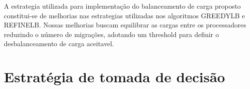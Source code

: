 A estrategia utilizada para implementação do balanceamento de carga proposto constitui-se de melhorias nas estrategias utilizadas nos algoritmos GREEDYLB e REFINELB. Nossas melhorias buscam equilibrar as cargas entre os processadores reduzindo o número de migrações, adotando um threshold para definir o desbalanceamento de carga aceitavel. 

\section{Estratégia de tomada de decisão}

